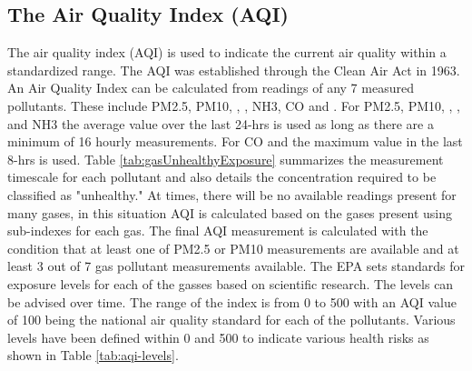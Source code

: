 \subsection{The Air Quality Index (AQI)}
The air quality index (AQI) is used to indicate the current air quality within a standardized range.
The AQI was established through the Clean Air Act in 1963. An Air Quality Index can be calculated
from readings of any 7 measured pollutants. These include PM2.5, PM10, \sdo, \nox, NH3, CO and
\ozone. For PM2.5, PM10, \sdo, \nox, and NH3 the average value over the last 24-hrs is used as long
as there are a minimum of 16 hourly measurements. For CO and \ozone the maximum value in the last
8-hrs is used. Table \ref{tab:gasUnhealthyExposure} summarizes the measurement timescale for each
pollutant and also details the concentration required to be classified as "unhealthy." At times,
there will be no available readings present for many gases, in this situation AQI is calculated
based on the gases present using sub-indexes for each gas. The final AQI measurement is calculated
with the condition that at least one of PM2.5 or PM10 measurements are available and at least 3 out
of 7 gas pollutant measurements available. The EPA sets standards for exposure levels for each of
the gasses based on scientific research. The levels can be advised over time. The range of the index
is from 0 to 500 with an AQI value of 100 being the national air quality standard for each of the
pollutants. Various levels have been defined within 0 and 500 to indicate various health risks as
shown in Table \ref{tab:aqi-levels}. 

